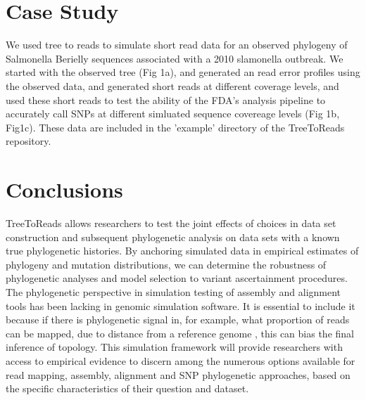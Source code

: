 \documentclass{bioinfo}
\begin{document}
\section{Case Study}
We used tree to reads to simulate short read data for an observed phylogeny of Salmonella Berielly sequences associated with a 2010 slamonella outbreak.
We started with the observed tree (Fig 1a), and generated an read error profiles using the observed data, and generated short reads at different coverage levels,
and used these short reads to test the ability of the FDA's analysis pipeline to accurately call SNPs at different simluated sequence covereage levels (Fig 1b, Fig1c). 
These data are included in the 'example' directory of the TreeToReads repository.


\section{Conclusions}
TreeToReads allows researchers to test the joint effects of choices in data set construction and subsequent phylogenetic analysis on data sets with a known true phylogenetic histories.
By anchoring simulated data in empirical estimates of phylogeny and mutation distributions, 
we can determine the robustness of phylogenetic analyses and model selection to variant ascertainment procedures.
The phylogenetic perspective in simulation testing of assembly and alignment tools has been lacking in genomic simulation software.
It is essential to include it because if there is phylogenetic signal in, for example, what proportion of reads can be mapped, due to distance from a reference genome \citep{bertels_automated_2014},
this can bias the final inference of topology.
This simulation framework will provide researchers with access to empirical evidence to discern among the numerous options available for read mapping, assembly, alignment and SNP phylogenetic approaches,
based on the specific characteristics of their question and dataset.


\end{document}
